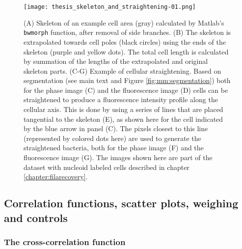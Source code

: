\begin{figure}
	\centering
	\texttt{[image: thesis\_skeleton\_and\_straightening-01.png]}
	\caption{ 
		(A) Skeleton of an example cell area (gray) calculated by Matlab's \texttt{bwmorph} function, after removal of side branches. 
		(B) The skeleton is extrapolated towards cell poles (black circles) using the ends of the skeleton (purple and yellow dots). The total cell length is calculated by summation of the lengths of the extrapolated and original skeleton parts.
		(C-G) Example of cellular straightening. Based on segmentation (see main text and Figure \ref{fig:mm:segmentation}) both for the phase image (C) and the fluorescence image (D) cells can be straightened to produce a fluorescence intensity profile along the cellular axis. This is done by using a series of lines that are placed tangential to the skeleton (E), as shown here for the cell indicated by the blue arrow in panel (C). The pixels closest to this line (represented by colored dots here) are used to generate the straightened bacteria, both for the phase image (F) and the fluorescence image (G).
		The images shown here are part of the dataset with nucleoid labeled  cells described in chapter \ref{chapter:filarecovery}.
	}
	\label{fig:mm:skeletonstraightening}
\end{figure}

\subsection{Correlation functions, scatter plots, weighing and controls}

\subsubsection{The cross-correlation function}

